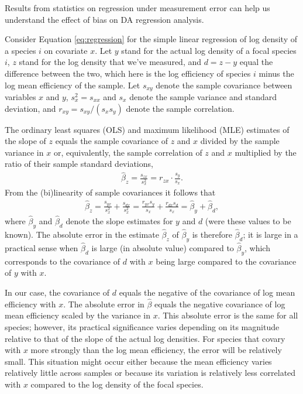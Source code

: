 \documentclass[
]{article}
\begin{document}
Results from statistics on regression under measurement error can help us understand the effect of bias on DA regression analysis.

Consider Equation \eqref{eq:regression} for the simple linear regression of log density of a species \(i\) on covariate \(x\).
Let \(y\) stand for the actual log density of a focal species \(i\), \(z\) stand for the log density that we've measured, and \(d = z - y\) equal the difference between the two, which here is the log efficiency of species \(i\) minus the log mean efficiency of the sample.
Let \(s_{xy}\) denote the sample covariance between variables \(x\) and \(y\), \(s^{2}_{x} = s_{xx}\) and \(s_{x}\) denote the sample variance and standard deviation, and \(r_{xy} = s_{xy}/(s_{x}s_{y})\) denote the sample correlation.

The ordinary least squares (OLS) and maximum likelihood (MLE) estimates of the slope of \(z\) equals the sample covariance of \(z\) and \(x\) divided by the sample variance in \(x\) or, equivalently, the sample correlation of \(z\) and \(x\) multiplied by the ratio of their sample standard deviations,
\begin{align}
  \hat \beta_z = \frac{s_{zx}}{s^2_x} = r_{zx} \cdot \frac{s_y}{s_x}.
\end{align}
From the (bi)linearity of sample covariances it follows that
\begin{align}
  \hat \beta_z 
  = \frac{s_{yx}}{s^2_x} + \frac{s_{dx}}{s^2_x} 
  = \frac{r_{yx} s_y}{s_x} + \frac{r_{dx} s_d}{s_x} 
  = \hat \beta_y + \hat \beta_d,
\end{align}
where \(\hat \beta_y\) and \(\hat \beta_d\) denote the slope estimates for \(y\) and \(d\) (were these values to be known).
The absolute error in the estimate \(\hat \beta_{z}\) of \(\hat \beta_{y}\) is therefore \(\hat \beta_{d}\); it is large in a practical sense when \(\hat \beta_{d}\) is large (in absolute value) compared to \(\hat \beta_{y}\), which corresponds to the covariance of \(d\) with \(x\) being large compared to the covariance of \(y\) with \(x\).

In our case, the covariance of \(d\) equals the negative of the covariance of log mean efficiency with \(x\).
The absolute error in \(\hat \beta\) equals the negative covariance of log mean efficiency scaled by the variance in \(x\).
This absolute error is the same for all species; however, its practical significance varies depending on its magnitude relative to that of the slope of the actual log densities.
For species that covary with \(x\) more strongly than the log mean efficiency, the error will be relatively small.
This situation might occur either because the mean efficiency varies relatively little across samples or because its variation is relatively less correlated with \(x\) compared to the log density of the focal species.
\end{document}
